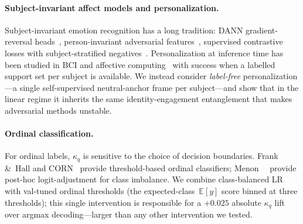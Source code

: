 \paragraph{Subject-invariant affect models and personalization.}
Subject-invariant emotion recognition has a long tradition: DANN
gradient-reversal heads~\cite{ganin2015dann}, person-invariant
adversarial features~\cite{li2017cross}, supervised contrastive
losses with subject-stratified negatives~\cite{khosla2020supcon}.
Personalization at inference time has been studied in BCI
\cite{lotte2018review} and affective computing~\cite{rudovic2018personalized}
with success when a labelled support set per subject is available.
We instead consider \emph{label-free} personalization---a single
self-supervised neutral-anchor frame per subject---and show that
in the linear regime it inherits the same identity-engagement
entanglement that makes adversarial methods unstable.

\paragraph{Ordinal classification.} For ordinal labels, $\kappa_q$
is sensitive to the choice of decision boundaries. Frank \&\ Hall
\cite{frank2001ordinal} and CORN~\cite{shi2023corn} provide
threshold-based ordinal classifiers; Menon~\etal~\cite{menon2021logit}
provide post-hoc logit-adjustment for class imbalance. We combine
class-balanced LR with val-tuned ordinal thresholds (the
expected-class~$\mathbb{E}[y]$ score binned at three thresholds);
this single intervention is responsible for a $+0.025$ absolute
$\kappa_q$ lift over argmax decoding---larger than any other
intervention we tested.
